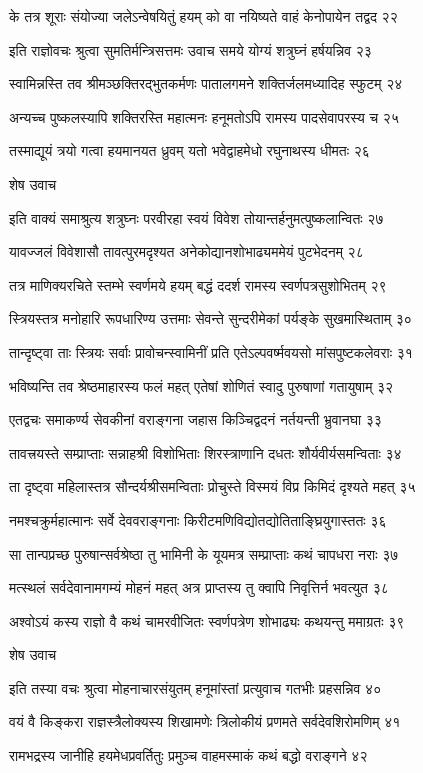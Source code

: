 के तत्र शूराः संयोज्या जलेऽन्वेषयितुं हयम्
को वा नयिष्यते वाहं केनोपायेन तद्वद २२

इति राज्ञोवचः श्रुत्वा सुमतिर्मन्त्रिसत्तमः
उवाच समये योग्यं शत्रुघ्नं हर्षयन्निव २३

स्वामिन्नस्ति तव श्रीमञ्छक्तिरद्भुतकर्मणः
पातालगमने शक्तिर्जलमध्यादिह स्फुटम् २४

अन्यच्च पुष्कलस्यापि शक्तिरस्ति महात्मनः
हनूमतोऽपि रामस्य पादसेवापरस्य च २५

तस्माद्यूयं त्रयो गत्वा हयमानयत ध्रुवम्
यतो भवेद्वाहमेधो रघुनाथस्य धीमतः २६

शेष उवाच

इति वाक्यं समाश्रुत्य शत्रुघ्नः परवीरहा
स्वयं विवेश तोयान्तर्हनुमत्पुष्कलान्वितः २७

यावज्जलं विवेशासौ तावत्पुरमदृश्यत
अनेकोद्यानशोभाढ्यममेयं पुटभेदनम् २८

तत्र माणिक्यरचिते स्तम्भे स्वर्णमये हयम्
बद्धं ददर्श रामस्य स्वर्णपत्रसुशोभितम् २९

स्त्रियस्तत्र मनोहारि रूपधारिण्य उत्तमाः
सेवन्ते सुन्दरीमेकां पर्यङ्के सुखमास्थिताम् ३०

तान्दृष्ट्वा ताः स्त्रियः सर्वाः प्रावोचन्स्वामिनीं प्रति
एतेऽल्पवर्ष्मवयसो मांसपुष्टकलेवराः ३१

भविष्यन्ति तव श्रेष्ठमाहारस्य फलं महत्
एतेषां शोणितं स्वादु पुरुषाणां गतायुषाम् ३२

एतद्वचः समाकर्ण्य सेवकीनां वराङ्गना
जहास किञ्चिद्वदनं नर्तयन्ती भ्रुवानघा ३३

तावत्त्रयस्ते सम्प्राप्ताः सन्नाहश्री विशोभिताः
शिरस्त्राणानि दधतः शौर्यवीर्यसमन्विताः ३४

ता दृष्ट्वा महिलास्तत्र सौन्दर्यश्रीसमन्विताः
प्रोचुस्ते विस्मयं विप्र किमिदं दृश्यते महत् ३५

नमश्चक्रुर्महात्मानः सर्वे देववराङ्गनाः
किरीटमणिविद्योतद्योतिताङ्घ्रियुगास्ततः ३६

सा तान्पप्रच्छ पुरुषान्सर्वश्रेष्ठा तु भामिनी
के यूयमत्र सम्प्राप्ताः कथं चापधरा नराः ३७

मत्स्थलं सर्वदेवानामगम्यं मोहनं महत्
अत्र प्राप्तस्य तु क्वापि निवृत्तिर्न भवत्युत ३८

अश्वोऽयं कस्य राज्ञो वै कथं चामरवीजितः
स्वर्णपत्रेण शोभाढ्यः कथयन्तु ममाग्रतः ३९

शेष उवाच

इति तस्या वचः श्रुत्वा मोहनाचारसंयुतम्
हनूमांस्तां प्रत्युवाच गतभीः प्रहसन्निव ४०

वयं वै किङ्करा राज्ञस्त्रैलोक्यस्य शिखामणेः
त्रिलोकीयं प्रणमते सर्वदेवशिरोमणिम् ४१

रामभद्रस्य जानीहि हयमेधप्रवर्तितुः
प्रमुञ्च वाहमस्माकं कथं बद्धो वराङ्गने ४२

